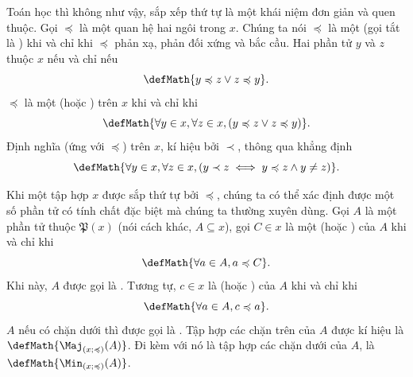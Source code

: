 Toán học thì không như vậy, sắp xếp thứ tự là một khái niệm đơn giản và quen thuộc. Gọi $\preccurlyeq$ là một quan hệ hai ngôi trong $x$. Chúng ta nói $\preccurlyeq$ là một  (gọi tắt là ) khi và chỉ khi $\preccurlyeq$ phản xạ, phản đối xứng và bắc cầu. Hai phần tử $y$ và $z$ thuộc $x$  nếu và chỉ nếu $$\defMath{y \preccurlyeq z \lor z \preccurlyeq y}.$$
$\preccurlyeq$ là một  (hoặc ) trên $x$ khi và chỉ khi
\begin{equation*}
   \defMath{\forall y \in x, \forall z \in x, (y \preccurlyeq z \lor z \preccurlyeq y)}.
\end{equation*}
Định nghĩa  (ứng với $\preccurlyeq$) trên $x$, kí hiệu bởi $\prec$, thông qua khẳng định
\begin{equation*}
   \defMath{\forall y \in x, \forall z \in x, (y \prec z \iff y \preccurlyeq z \land y \neq z)}.
\end{equation*}

Khi một tập hợp $x$ được sắp thứ tự bởi $\preccurlyeq$, chúng ta có thể xác định được một số phần tử có tính chất đặc biệt mà chúng ta thường xuyên dùng. Gọi $A$ là một phần tử thuộc $\mathfrak{P}(x)$ (nói cách khác, $A \subseteq x$), gọi $C \in x$ là một  (hoặc ) của $A$ khi và chỉ khi \begin{equation*}
   \defMath{\forall a \in A, a \preccurlyeq C}.
\end{equation*}
Khi này, $A$ được gọi là . Tương tự, $c \in x$ là  (hoặc ) của $A$ khi và chỉ khi \begin{equation*}
   \defMath{\forall a \in A, c \preccurlyeq a}.
\end{equation*} 
$A$ nếu có chặn dưới thì được gọi là . Tập hợp các chặn trên của $A$ được kí hiệu là $\defMath{\Maj_{\left(x; \preccurlyeq\right)}(A)}$. Đi kèm với nó là tập hợp các chặn dưới của $A$, là $\defMath{\Min_{\left(x; \preccurlyeq\right)}(A)}$.

